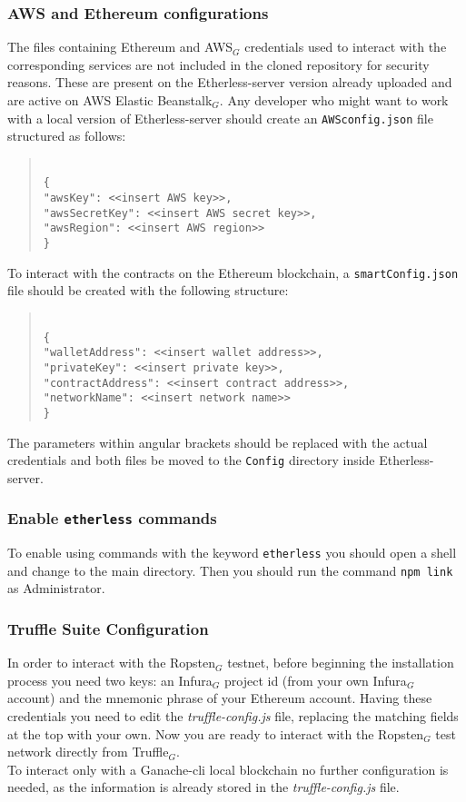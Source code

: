 \subsubsection{AWS and Ethereum configurations}
The files containing Ethereum and AWS$_{G}$ credentials used to interact with the corresponding services are not included in the cloned repository for security reasons. These are present on the Etherless-server version already uploaded and are active on AWS Elastic Beanstalk$_{G}$.
Any developer who might want to work with a local version of Etherless-server should create an \texttt{AWSconfig.json} file structured as follows:
\begin{quote}
\texttt{ \\
	\{\\
		"awsKey": <<insert AWS key>>, \\
		"awsSecretKey": <<insert AWS secret key>>, \\
		"awsRegion": <<insert AWS region>> \\
	\}\\
}
\end{quote}
To interact with the contracts on the Ethereum blockchain, a \texttt{smartConfig.json} file should be created with the following structure:
\begin{quote}
\texttt{ \\
	\{\\
	"walletAddress": <<insert wallet address>>, \\
	"privateKey": <<insert private key>>, \\
	"contractAddress": <<insert contract address>>, \\
	"networkName": <<insert network name>> \\
	\}\\
}
\end{quote}
The parameters within angular brackets should be replaced with the actual credentials and both files be moved to the \texttt{Config} directory inside Etherless-server.
\subsubsection{Enable \texttt{etherless} commands}
To enable using commands with the keyword \texttt{etherless} you should open a shell and change to the main directory. Then you should run the command \texttt{npm link} as Administrator.
\subsubsection{Truffle Suite Configuration}
	In order to interact with the Ropsten$_{G}$ testnet, before beginning the installation process you need two keys: an Infura$_{G}$ project id (from your own Infura$_{G}$ account) and the mnemonic phrase of your Ethereum account. Having these credentials you need to edit the \textit{truffle-config.js} file, replacing the matching fields at the top with your own. Now you are ready to interact with the Ropsten$_{G}$ test network directly from Truffle$_{G}$.\\
	To interact only with a Ganache-cli local blockchain no further configuration is needed, as the information is already stored in the \textit{truffle-config.js} file.
